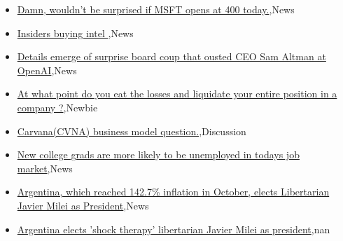 \documentclass{article}%
\begin{document}
%
\begin{itemize}%
\item%
\href{https://reddit.com/r/wallstreetbets/comments/17zk81q/damn\_wouldnt\_be\_surprised\_if\_msft\_opens\_at\_400/}{Damn, wouldn't be surprised if MSFT opens at 400 today.},News%
\item%
\href{https://reddit.com/r/StockMarket/comments/17yfb25/insiders\_buying\_intel/}{Insiders buying intel },News%
\item%
\href{https://reddit.com/r/StockMarket/comments/17y8iw1/details\_emerge\_of\_surprise\_board\_coup\_that\_ousted/}{Details emerge of surprise board coup that ousted CEO Sam Altman at OpenAI},News%
\item%
\href{https://reddit.com/r/StockMarket/comments/17y5v24/at\_what\_point\_do\_you\_eat\_the\_losses\_and\_liquidate/}{At what point do you eat the losses and liquidate your entire position in a company ?},Newbie%
\item%
\href{https://reddit.com/r/StockMarket/comments/17y5lpf/carvanacvna\_business\_model\_question/}{Carvana(CVNA) business model question.},Discussion%
\item%
\href{https://reddit.com/r/Economics/comments/17zf0ty/new\_college\_grads\_are\_more\_likely\_to\_be/}{New college grads are more likely to be unemployed in todays job market},News%
\item%
\href{https://reddit.com/r/Economics/comments/17zd7jz/argentina\_which\_reached\_1427\_inflation\_in\_october/}{Argentina, which reached 142.7\% inflation in October, elects Libertarian Javier Milei as President},News%
\item%
\href{https://reddit.com/r/Economics/comments/17za9tp/argentina\_elects\_shock\_therapy\_libertarian\_javier/}{Argentina elects 'shock therapy' libertarian Javier Milei as president},nan%
\end{itemize}%
\end{document}
